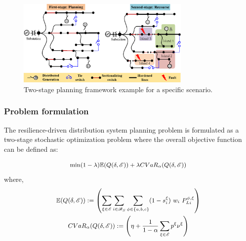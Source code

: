     \begin{figure}[t]
        \centering
        \includegraphics[width=0.75\textwidth]{figures/first_second_stage_model.eps}
        \caption{Two-stage planning framework example for a specific scenario.}
        \label{fig:model_representation}
    \end{figure}

\subsubsection{Problem formulation}
The resilience-driven distribution system planning problem is formulated as a two-stage stochastic optimization problem where the overall objective function can be defined as:

\begin{equation}
\small
    \begin{split}
    \min (1-\lambda)\mathbb{E}(Q(\delta, \mathcal{E})) + \lambda CVaR_\alpha(Q(\delta, \mathcal{E}))
    \end{split}
    \label{eq:main_objective}
\end{equation}
where,
\vspace{-5pt}
\begin{equation*}
\small
    \begin{gathered}
        \mathbb{E}(Q(\delta, \mathcal{E})) := \left(\sum_{\xi \in \mathcal{E}}\sum_{i\in  \mathcal{B}_S}\sum_{\phi\in\{a,b,c\}}(1 - s^\xi_i)\ w_i\ P_{Li}^{\phi,\xi}\right)\\
        CVaR_\alpha(Q(\delta, \mathcal{E})) := \left(\eta + \frac{1}{1-\alpha}\sum_{\xi \in \mathcal{E}}p^\xi\nu^\xi\right)
    \end{gathered}
\end{equation*}

